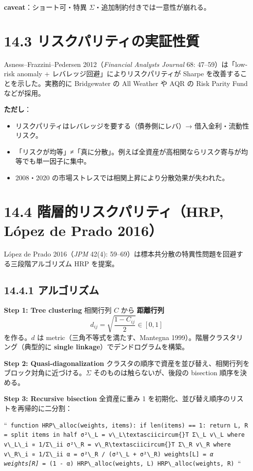 \documentclass[11pt,a4paper]{report}
\begin{document}
\textbf{caveat}：ショート可・特異 $\Sigma$・追加制約付きでは一意性が崩れる。

\section{14.3 リスクパリティの実証性質}

Asness–Frazzini–Pedersen 2012（\emph{Financial Analysts Journal} 68: 47–59）は「low-risk anomaly + レバレッジ回避」によりリスクパリティが Sharpe を改善することを示した。実務的に Bridgewater の All Weather や AQR の Risk Parity Fund などが採用。

\textbf{ただし}：
\begin{itemize}
\item リスクパリティはレバレッジを要する（債券側にレバ）→ 借入金利・流動性リスク。
\item 「リスクが均等」≠「真に分散」。例えば全資産が高相関ならリスク寄与が均等でも単一因子に集中。
\item 2008・2020 の市場ストレスでは相関上昇により分散効果が失われた。
\end{itemize}

\section{14.4 階層的リスクパリティ（HRP, López de Prado 2016）}

López de Prado 2016（\emph{JPM} 42(4): 59–69）は標本共分散の特異性問題を回避する三段階アルゴリズム HRP を提案。

\subsection{14.4.1 アルゴリズム}

\textbf{Step 1: Tree clustering} 相関行列 $C$ から \textbf{距離行列} \[ d_{ij} = \sqrt{\frac{1 - C_{ij}}{2}} \in [0, 1] \] を作る。$d$ は metric（三角不等式を満たす、Mantegna 1999）。階層クラスタリング（典型的に \textbf{single linkage}）でデンドログラムを構築。

\textbf{Step 2: Quasi-diagonalization} クラスタの順序で資産を並び替え、相関行列をブロック対角に近づける。$\Sigma$ そのものは触らないが、後段の bisection 順序を決める。

\textbf{Step 3: Recursive bisection} 全資産に重み 1 を初期化、並び替え順序のリストを再帰的に二分割：

``\texttt{ function HRP\textbackslash{}\_alloc(weights, items): if len(items) == 1: return L, R = split items in half σ²\textbackslash{}\_L = v\textbackslash{}\_L\textbackslash{}textasciicircum\{\}T Σ\textbackslash{}\_L v\textbackslash{}\_L  where v\textbackslash{}\_L\textbackslash{}\_i ∝ 1/Σ\textbackslash{}\_ii σ²\textbackslash{}\_R = v\textbackslash{}\_R\textbackslash{}textasciicircum\{\}T Σ\textbackslash{}\_R v\textbackslash{}\_R  where v\textbackslash{}\_R\textbackslash{}\_i ∝ 1/Σ\textbackslash{}\_ii α = σ²\textbackslash{}\_R / (σ²\textbackslash{}\_L + σ²\textbackslash{}\_R) weights[L] \emph{= α weights[R] }= (1 - α) HRP\textbackslash{}\_alloc(weights, L) HRP\textbackslash{}\_alloc(weights, R) }``
\end{document}
